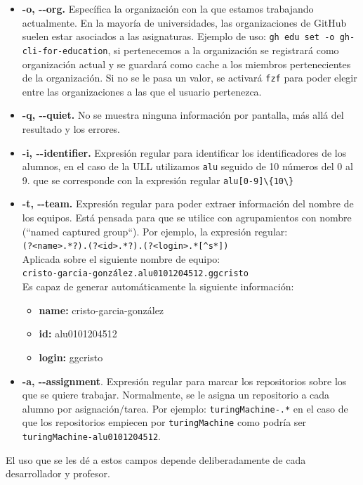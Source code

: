 \begin{itemize}
    \item \textbf{-o, -{}-org.} Específica la organización con la que estamos trabajando actualmente. En la mayoría de universidades, las organizaciones de GitHub suelen estar asociados a las asignaturas.
    Ejemplo de uso: \verb|gh edu set -o gh-cli-for-education|, si pertenecemos a la organización se registrará como organización actual y se guardará como cache a los miembros pertenecientes de la organización.
    Si no se le pasa un valor, se activará \verb|fzf| para poder elegir entre las organizaciones a las que el usuario pertenezca.
    \item \textbf{-q, -{}-quiet.} No se muestra ninguna información por pantalla, más allá del resultado y los errores.
    \item \textbf{-i, -{}-identifier.} Expresión regular para identificar los identificadores de los alumnos, en el caso de la ULL utilizamos \verb|alu| seguido de 10 números del 0 al 9. que se corresponde con la expresión regular \verb|alu[0-9]\{10\}|
    \item \textbf{-t, -{}-team.} Expresión regular para poder extraer información del nombre de los equipos. Está pensada para que se utilice con agrupamientos con nombre (``named captured group``). Por ejemplo, la expresión regular:\\ \verb|(?<name>.*?).(?<id>.*?).(?<login>.*[^s*])|\\
    Aplicada sobre el siguiente nombre de equipo:\\
    \verb|cristo-garcia-gonzález.alu0101204512.ggcristo|\\
    Es capaz de generar automáticamente la siguiente información:
    \begin{itemize}
        \item \textbf{name:} cristo-garcia-gonzález
        \item \textbf{id:} alu0101204512
        \item \textbf{login:} ggcristo
    \end{itemize}
    \item \textbf{-a, -{}-assignment}. Expresión regular para marcar los repositorios sobre los que se quiere trabajar. Normalmente, se le asigna un repositorio a cada alumno por asignación/tarea. Por ejemplo: \verb|turingMachine-.*| en el caso de que los repositorios empiecen por \verb|turingMachine| como podría ser \verb|turingMachine-alu0101204512|.
\end{itemize}
El uso que se les dé a estos campos depende deliberadamente de cada desarrollador y profesor.

